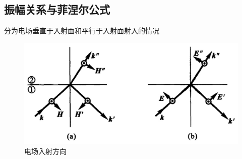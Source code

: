     \subsection{振幅关系与菲涅尔公式}
        分为电场垂直于入射面和平行于入射面射入的情况
        \begin{figure}[H]
            \centering  %
            \includegraphics[width=0.8\linewidth]{figs/电场入射情况.jpg}
            \caption{电场入射方向} %
            \end{figure}
